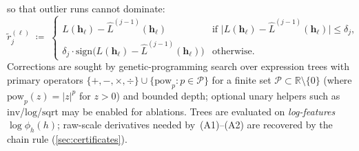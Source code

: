 \documentclass[11pt]{article}
\newcommand{\calP}{\mathcal{P}}
\newcommand{\bbR}{\mathbb{R}}
\newcommand{\Lhat}{\hat{L}}
\theoremstyle{plain}
\theoremstyle{remark}
\begin{document}
so that outlier runs cannot dominate:
\begin{equation}\label{eq:pseudoresid-bb}
    \tilde{r}_j^{(\ell)}
    \;\coloneqq\;
    \begin{cases}
        L(\mathbf{h}_\ell) - \Lhat^{(j-1)}(\mathbf{h}_\ell)
            & \text{if }
              \bigl|L(\mathbf{h}_\ell) - \Lhat^{(j-1)}(\mathbf{h}_\ell)\bigr|
              \leq \delta_j, \\[3pt]
        \delta_j \cdot
          \mathrm{sign}\bigl(L(\mathbf{h}_\ell)
                        - \Lhat^{(j-1)}(\mathbf{h}_\ell)\bigr)
            & \text{otherwise}.
    \end{cases}
\end{equation}
Corrections are sought by genetic-programming search over expression trees with
primary operators $\{+, -, \times, \div\} \cup \{\mathrm{pow}_p : p \in \calP\}$
for a finite set $\calP \subset \bbR \setminus \{0\}$
(where $\mathrm{pow}_p(z) = |z|^p$ for $z > 0$) and bounded depth;
optional unary helpers such as $\mathrm{inv}$/$\mathrm{log}$/$\mathrm{sqrt}$ may be enabled for ablations.
Trees are evaluated on \emph{log-features} $\log\phi_h(h)$; raw-scale derivatives
needed by~(A1)--(A2) are recovered by the chain rule (\cref{sec:certificates}).
\end{document}
